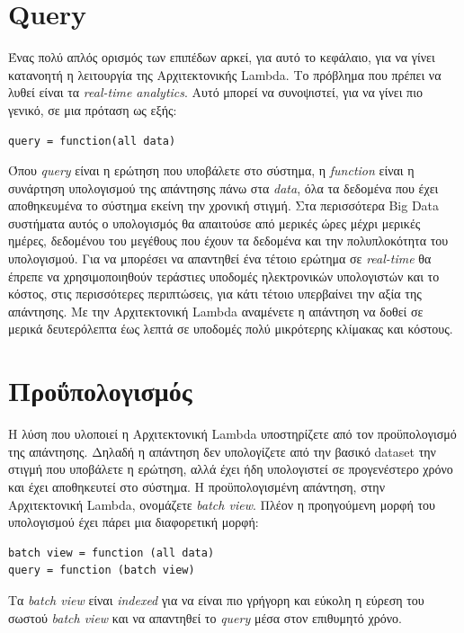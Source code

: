 \section{Query}
Ένας πολύ απλός ορισμός των επιπέδων αρκεί, για αυτό το κεφάλαιο, για να γίνει κατανοητή η λειτουργία της Αρχιτεκτονικής Lambda. Το πρόβλημα που πρέπει να λυθεί είναι τα \textit{real-time analytics}. Αυτό μπορεί να συνοψιστεί, για να γίνει πιο γενικό, σε μια πρόταση ως εξής:
\begin{verbatim}
query = function(all data)
\end{verbatim}

Όπου \textit{query} είναι η ερώτηση που υποβάλετε στο σύστημα, η \textit{function} είναι η συνάρτηση υπολογισμού της απάντησης πάνω στα \textit{data}, όλα τα δεδομένα που έχει αποθηκευμένα το σύστημα εκείνη την χρονική στιγμή.
\newline
Στα περισσότερα Big Data συστήματα αυτός ο υπολογισμός θα απαιτούσε από μερικές ώρες μέχρι μερικές ημέρες, δεδομένου του μεγέθους που έχουν τα δεδομένα και την πολυπλοκότητα του υπολογισμού. Για να μπορέσει να απαντηθεί ένα τέτοιο ερώτημα σε \textit{real-time} θα έπρεπε να χρησιμοποιηθούν τεράστιες υποδομές ηλεκτρονικών υπολογιστών και το κόστος, στις περισσότερες περιπτώσεις, για κάτι τέτοιο υπερβαίνει την αξία της απάντησης. Με την Αρχιτεκτονική Lambda αναμένετε η απάντηση να δοθεί σε μερικά δευτερόλεπτα έως λεπτά σε υποδομές πολύ μικρότερης κλίμακας και κόστους. 

\section{Προΰπολογισμός}
Η λύση που υλοποιεί η Αρχιτεκτονική Lambda υποστηρίζετε από τον προϋπολογισμό της απάντησης. Δηλαδή η απάντηση δεν υπολογίζετε από την βασικό dataset την στιγμή που υποβάλετε η ερώτηση, αλλά έχει ήδη υπολογιστεί σε προγενέστερο χρόνο και έχει αποθηκευτεί στο σύστημα. Η προϋπολογισμένη απάντηση, στην Αρχιτεκτονική Lambda, ονομάζετε \textit{batch view}. Πλέον η προηγούμενη μορφή του υπολογισμού έχει πάρει μια διαφορετική μορφή:
\begin{verbatim}
batch view = function (all data)
query = function (batch view)
\end{verbatim}
Τα \textit{batch view} είναι \textit{indexed} για να είναι πιο γρήγορη και εύκολη η εύρεση του σωστού \textit{batch view} και να απαντηθεί το \textit{query} μέσα στον επιθυμητό χρόνο.



